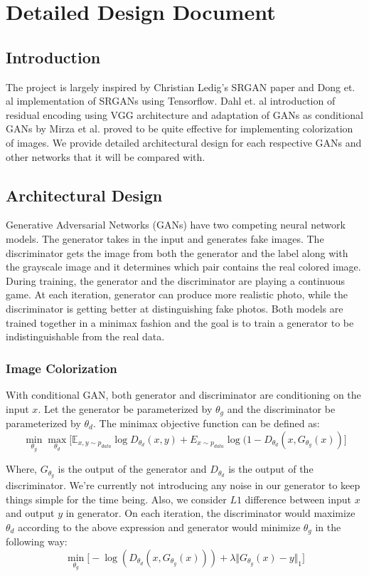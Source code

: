 \documentclass[oneside,a4paper,12pt]{report}
\begin{document}
\chapter{Detailed Design Document }
 \section{Introduction}
The project is largely inspired by Christian Ledig's SRGAN paper \cite{ledig2017photorealistic} and Dong et. al \cite{dong2014super} implementation of SRGANs using Tensorflow. Dahl et. al \cite{dahl2016automatic} introduction of residual encoding using VGG architecture and adaptation of GANs as conditional GANs by Mirza et al. \cite{mirza2014conditional} proved to be quite effective for implementing colorization of images. We provide detailed architectural design for each respective GANs and other networks that it will be compared with.
\section{Architectural Design}
	Generative Adversarial Networks (GANs) have two competing neural network models. The generator takes in the input and generates fake images. The discriminator gets the image from both the generator and the label along with the grayscale image and it determines which pair contains the real colored image. During training, the generator and the discriminator are playing a continuous game. At each iteration, generator can produce more realistic photo, while the discriminator is getting better at distinguishing fake photos. Both models are trained together in a minimax fashion and the goal is to train a generator to be indistinguishable from the real data.
	\subsection{Image Colorization}
	\hspace{0.4 in}With conditional GAN, both generator and discriminator are conditioning on the input $x$. Let the generator be parameterized by $\theta_g$ and the discriminator be parameterized by $\theta_d$. The minimax objective function can be defined as:
	\[
		\min_{\theta_g}\max_{\theta_d}\Big[\mathbb{E}_{x,y\sim p_{data}} \log D_{\theta_d}(x,y) + E_{x\sim p_{data}} \log(1 - D_{\theta_d}(x, G_{\theta_g}(x))\Big]
	\]

	Where, $G_{\theta_{g}}$ is the output of the generator and $D_{\theta_d}$ is the output of the discriminator.
	We're currently not introducing any noise in our generator to keep things simple for the time being. Also, we consider $L1$ difference between input $x$ and output $y$ in generator. On each iteration, the discriminator would maximize $\theta_d$ according to the above expression and generator would minimize $\theta_g$ in the following way:
	\[
		\min_{\theta_g}\Big[-\log(D_{\theta_d}(x,G_{\theta_g}(x)))+\lambda \Vert G_{\theta_g}(x) - y \Vert_1 \Big]
	\]
\end{document}
